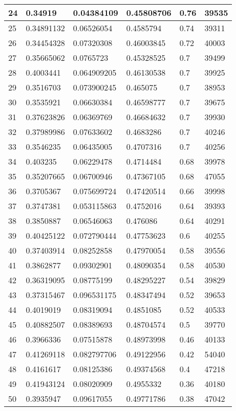 \begin{longtable}{|l|l|l|l|l|l|}
24 & 0.34919 & 0.04384109 & 0.45808706 & 0.76 & 39535 \\ \hline 
25 & 0.34891132 & 0.06526054 & 0.4585794 & 0.74 & 39311 \\ \hline 
26 & 0.34454328 & 0.07320308 & 0.46003845 & 0.72 & 40003 \\ \hline 
27 & 0.35665062 & 0.0765723 & 0.45328525 & 0.7 & 39499 \\ \hline 
28 & 0.4003441 & 0.064909205 & 0.46130538 & 0.7 & 39925 \\ \hline 
29 & 0.3516703 & 0.073900245 & 0.465075 & 0.7 & 38953 \\ \hline 
30 & 0.3535921 & 0.06630384 & 0.46598777 & 0.7 & 39675 \\ \hline 
31 & 0.37623826 & 0.06369769 & 0.46684632 & 0.7 & 39930 \\ \hline 
32 & 0.37989986 & 0.07633602 & 0.4683286 & 0.7 & 40246 \\ \hline 
33 & 0.3546235 & 0.06435005 & 0.4707316 & 0.7 & 40256 \\ \hline 
34 & 0.403235 & 0.06229478 & 0.4714484 & 0.68 & 39978 \\ \hline 
35 & 0.35207665 & 0.06700946 & 0.47367105 & 0.68 & 47055 \\ \hline 
36 & 0.3705367 & 0.075699724 & 0.47420514 & 0.66 & 39998 \\ \hline 
37 & 0.3747381 & 0.053115863 & 0.4752016 & 0.64 & 39393 \\ \hline 
38 & 0.3850887 & 0.06546063 & 0.476086 & 0.64 & 40291 \\ \hline 
39 & 0.40425122 & 0.072790444 & 0.47753623 & 0.6 & 40255 \\ \hline 
40 & 0.37403914 & 0.08252858 & 0.47970054 & 0.58 & 39556 \\ \hline 
41 & 0.3862877 & 0.09302901 & 0.48090354 & 0.58 & 40530 \\ \hline 
42 & 0.36319095 & 0.08775199 & 0.48295227 & 0.54 & 39829 \\ \hline 
43 & 0.37315467 & 0.096531175 & 0.48347494 & 0.52 & 39653 \\ \hline 
44 & 0.4019019 & 0.08319094 & 0.4851085 & 0.52 & 40533 \\ \hline 
45 & 0.40882507 & 0.08389693 & 0.48704574 & 0.5 & 39770 \\ \hline 
46 & 0.3966336 & 0.07515878 & 0.48973998 & 0.46 & 40133 \\ \hline 
47 & 0.41269118 & 0.082797706 & 0.49122956 & 0.42 & 54040 \\ \hline 
48 & 0.4161617 & 0.08125386 & 0.49374568 & 0.4 & 47218 \\ \hline 
49 & 0.41943124 & 0.08020909 & 0.4955332 & 0.36 & 40180 \\ \hline 
50 & 0.3935947 & 0.09617055 & 0.49771786 & 0.38 & 47042 \\ \hline 
\end{longtable}